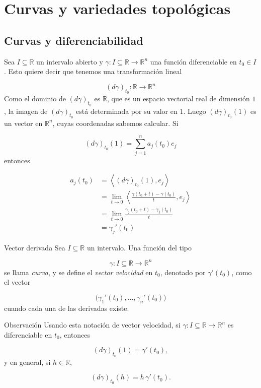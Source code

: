 \chapter{Curvas y variedades topológicas}
\label{ch:teo-2}
\section{Curvas y diferenciabilidad}
\begin{bookremark}{}
Sea $I\subseteq \mathbb{R}$ un intervalo abierto y $\gamma:I\subseteq \mathbb{R}\to \mathbb{R}^n$ una función diferenciable en $t_0\in I$. Esto quiere decir que tenemos una transformación lineal

\[
(d\gamma)_{t_0}:\mathbb{R}\longrightarrow \mathbb{R}^n
\]
Como el dominio de $(d\gamma)_{t_0}$ es $\mathbb{R}$, que es un espacio vectorial real de dimensión $1$, la imagen de $(d\gamma)_{t_0}$ está determinada por su valor en $1$. Luego $(d\gamma)_{t_0}(1)$ es un vector en $\mathbb{R}^n$, cuyas coordenadas sabemos calcular. Si

\[
(d\gamma)_{t_0}(1)=\sum_{j=1}^n a_j(t_0)e_j
\]
entonces

\[
\begin{aligned} a_j(t_0)&=\left\langle (d\gamma)_{t_0}(1),e_j\right\rangle\\&=\lim_{t\to 0}\left\langle \frac{\gamma(t_0+t)-\gamma(t_0)}{t},e_j\right\rangle\\&=
\lim_{t\to 0}\frac{\gamma_j(t_0+t)-\gamma_j(t_0)}{t}\\&=\gamma_j'(t_0)\end{aligned}
\]
\end{bookremark}
\begin{bookdefinition}{Vector derivada}
Sea $I\subseteq \mathbb{R}$ un intervalo. Una función del tipo

\[
\gamma:I\subseteq \mathbb{R}\longrightarrow \mathbb{R}^n
\]
se llama \emph{curva}, y se define el \emph{vector velocidad} en $t_0$, denotado por $\gamma'(t_0)$, como el vector

\[
\bigl(\gamma_1'(t_0),\dots,\gamma_n'(t_0)\bigr)
\]
cuando cada una de las derivadas existe.

\end{bookdefinition}
\begin{bookremark}{Observación}
Usando esta notación de vector velocidad, si $\gamma:I\subseteq \mathbb{R}\to \mathbb{R}^n$ es diferenciable en $t_0$, entonces

\[
(d\gamma)_{t_0}(1)=\gamma'(t_0),
\]
y en general, si $h\in \mathbb{R}$,

\[
(d\gamma)_{t_0}(h)=h\,\gamma'(t_0).
\]
\end{bookremark}
